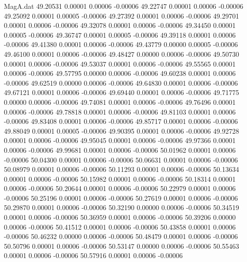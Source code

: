 \begin{filecontents}{MagA.dat}
  49.20531    0.00001    0.00006   -0.00006
  49.22747    0.00001    0.00006   -0.00006
  49.25092    0.00001    0.00005   -0.00006
  49.27392    0.00001    0.00006   -0.00006
  49.29701    0.00001    0.00006   -0.00006
  49.32078    0.00001    0.00006   -0.00006
  49.34450    0.00001    0.00005   -0.00006
  49.36747    0.00001    0.00005   -0.00006
  49.39118    0.00001    0.00006   -0.00006
  49.41380    0.00001    0.00006   -0.00006
  49.43779    0.00000    0.00005   -0.00006
  49.46100    0.00001    0.00006   -0.00006
  49.48427    0.00000    0.00006   -0.00006
  49.50730    0.00001    0.00006   -0.00006
  49.53037    0.00001    0.00006   -0.00006
  49.55565    0.00001    0.00006   -0.00006
  49.57795    0.00000    0.00006   -0.00006
  49.60238    0.00001    0.00006   -0.00006
  49.62519    0.00000    0.00006   -0.00006
  49.64830    0.00001    0.00006   -0.00006
  49.67121    0.00001    0.00006   -0.00006
  49.69440    0.00001    0.00006   -0.00006
  49.71775    0.00000    0.00006   -0.00006
  49.74081    0.00001    0.00006   -0.00006
  49.76496    0.00001    0.00006   -0.00006
  49.78818    0.00001    0.00006   -0.00006
  49.81103    0.00001    0.00006   -0.00006
  49.83408    0.00001    0.00006   -0.00006
  49.85717    0.00001    0.00006   -0.00006
  49.88049    0.00001    0.00005   -0.00006
  49.90395    0.00001    0.00006   -0.00006
  49.92728    0.00001    0.00006   -0.00006
  49.95045    0.00001    0.00006   -0.00006
  49.97366    0.00001    0.00006   -0.00006
  49.99681    0.00001    0.00006   -0.00006
  50.01962    0.00001    0.00006   -0.00006
  50.04300    0.00001    0.00006   -0.00006
  50.06631    0.00001    0.00006   -0.00006
  50.08979    0.00001    0.00006   -0.00006
  50.11293    0.00001    0.00006   -0.00006
  50.13634    0.00001    0.00006   -0.00006
  50.15982    0.00001    0.00006   -0.00006
  50.18314    0.00001    0.00006   -0.00006
  50.20644    0.00001    0.00006   -0.00006
  50.22979    0.00001    0.00006   -0.00006
  50.25196    0.00001    0.00006   -0.00006
  50.27619    0.00001    0.00006   -0.00006
  50.29870    0.00001    0.00006   -0.00006
  50.32190    0.00000    0.00006   -0.00006
  50.34519    0.00001    0.00006   -0.00006
  50.36959    0.00001    0.00006   -0.00006
  50.39206    0.00000    0.00006   -0.00006
  50.41512    0.00001    0.00006   -0.00006
  50.43858    0.00001    0.00006   -0.00006
  50.46232    0.00000    0.00006   -0.00006
  50.48479    0.00001    0.00006   -0.00006
  50.50796    0.00001    0.00006   -0.00006
  50.53147    0.00000    0.00006   -0.00006
  50.55463    0.00001    0.00006   -0.00006
  50.57916    0.00001    0.00006   -0.00006

\end{filecontents}
